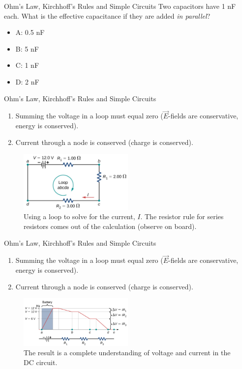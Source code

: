 \documentclass{beamer}
\begin{document}
\begin{frame}{Ohm's Law, Kirchhoff's Rules and Simple Circuits}
Two capacitors have 1 nF each.  What is the effective capacitance if they are added \textit{in parallel}?
\begin{itemize}
\item A: 0.5 nF
\item B: 5 nF
\item C: 1 nF
\item D: 2 nF
\end{itemize}
\end{frame}

\begin{frame}{Ohm's Law, Kirchhoff's Rules and Simple Circuits}
\small
\begin{enumerate}
\item Summing the voltage in a loop must equal zero ($\vec{E}$-fields are conservative, energy is conserved).
\item Current through a node is conserved (charge is conserved).
\end{enumerate}
\begin{figure}
\centering
\includegraphics[width=0.5\textwidth]{figures/batt6.png}
\caption{\label{fig:batt5} Using a loop to solve for the current, $I$.  The resistor rule for series resistors comes out of the calculation (observe on board).}
\end{figure}
\end{frame}

\begin{frame}{Ohm's Law, Kirchhoff's Rules and Simple Circuits}
\small
\begin{enumerate}
\item Summing the voltage in a loop must equal zero ($\vec{E}$-fields are conservative, energy is conserved).
\item Current through a node is conserved (charge is conserved).
\end{enumerate}
\begin{figure}
\centering
\includegraphics[width=0.5\textwidth]{figures/batt7.png}
\caption{\label{fig:batt6} The result is a complete understanding of voltage and current in the DC circuit.}
\end{figure}
\end{frame}
\end{document}
